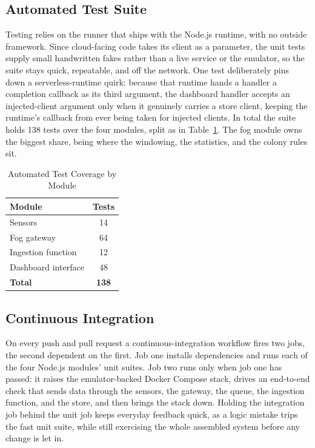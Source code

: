 \documentclass[conference]{IEEEtran}
\begin{document}
\subsection{Automated Test Suite}

Testing relies on the runner that ships with the Node.js runtime, with no outside framework. Since cloud-facing code takes its client as a parameter, the unit tests supply small handwritten fakes rather than a live service or the emulator, so the suite stays quick, repeatable, and off the network. One test deliberately pins down a serverless-runtime quirk: because that runtime hands a handler a completion callback as its third argument, the dashboard handler accepts an injected-client argument only when it genuinely carries a store client, keeping the runtime's callback from ever being taken for injected clients. In total the suite holds 138 tests over the four modules, split as in Table~\ref{tab:tests}. The fog module owns the biggest share, being where the windowing, the statistics, and the colony rules sit.

\begin{table}[!t]
\caption{Automated Test Coverage by Module}
\label{tab:tests}
\centering
\renewcommand{\arraystretch}{1.3}
\begin{tabular}{@{}lc@{}}
\toprule
\textbf{Module} & \textbf{Tests} \\
\midrule
Sensors & 14 \\
Fog gateway & 64 \\
Ingestion function & 12 \\
Dashboard interface & 48 \\
\midrule
\textbf{Total} & \textbf{138} \\
\bottomrule
\end{tabular}
\end{table}

\subsection{Continuous Integration}

On every push and pull request a continuous-integration workflow fires two jobs, the second dependent on the first. Job one installs dependencies and runs each of the four Node.js modules' unit suites. Job two runs only when job one has passed: it raises the emulator-backed Docker Compose stack, drives an end-to-end check that sends data through the sensors, the gateway, the queue, the ingestion function, and the store, and then brings the stack down. Holding the integration job behind the unit job keeps everyday feedback quick, as a logic mistake trips the fast unit suite, while still exercising the whole assembled system before any change is let in.
\end{document}
